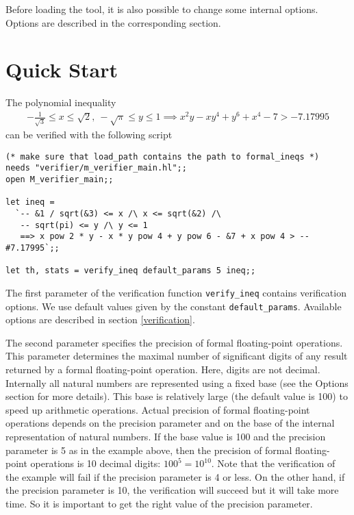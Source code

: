 \documentclass[a4paper]{article}
\begin{document}
Before loading the tool, it is also possible to change some internal options. Options are described in the corresponding section.


\section{Quick Start}

The polynomial inequality
\begin{multline*}
-\frac{1}{\sqrt{3}} \le x \le \sqrt{2},\ -\sqrt{\pi} \le y \le 1
\implies x^2 y - x y^4 + y^6 + x^4 - 7 > -7.17995
\end{multline*}
can be verified with the following script

\begin{verbatim}
(* make sure that load_path contains the path to formal_ineqs *)
needs "verifier/m_verifier_main.hl";;
open M_verifier_main;;

let ineq = 
  `-- &1 / sqrt(&3) <= x /\ x <= sqrt(&2) /\ 
   -- sqrt(pi) <= y /\ y <= 1
   ==> x pow 2 * y - x * y pow 4 + y pow 6 - &7 + x pow 4 > -- #7.17995`;;

let th, stats = verify_ineq default_params 5 ineq;;
\end{verbatim}

The first parameter of the verification function \verb|verify_ineq| contains verification options. We use default values given by the constant \verb|default_params|. Available options are described in section \ref{verification}.

The second parameter specifies the precision of formal floating-point operations. This parameter determines the maximal number of significant digits of any result returned by a formal floating-point operation. Here, digits are not decimal. Internally all natural numbers are represented using a fixed base (see the Options section for more details). This base is relatively large (the default value is 100) to speed up arithmetic operations. Actual precision of formal floating-point operations depends on the precision parameter and on the base of the internal representation of natural numbers. If the base value is 100 and the precision parameter is 5 as in the example above, then the precision of formal floating-point operations is 10 decimal digits: $100^5 = 10^{10}$. Note that the verification of the example will fail if the precision parameter is 4 or less. On the other hand, if the precision parameter is 10, the verification will succeed but it will take more time. So it is important to get the right value of the precision parameter.
\end{document}
